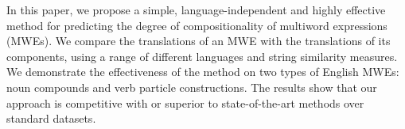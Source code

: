 In this paper, we propose a simple, language-independent and highly effective method for predicting the degree of compositionality of multiword expressions
 (MWEs). We compare the translations of an MWE with the translations of its
 components, using a range of different languages and string similarity
 measures. We demonstrate the effectiveness of the method on two types of
 English MWEs: noun compounds and verb particle constructions. The results show
 that our approach is competitive with or superior to state-of-the-art methods
 over standard datasets.


